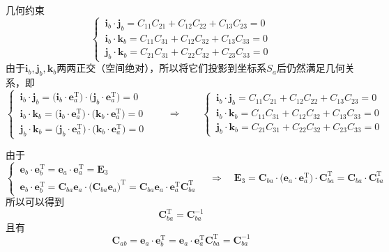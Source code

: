 \noa[2] 几何约束
\begin{equation}
	\begin{cases}
		\,\bm{i}_b \cdot \bm{j}_b = C_{11}C_{21} + C_{12}C_{22} + C_{13}C_{23} = 0 \\
		\,\bm{i}_b \cdot \bm{k}_b = C_{11}C_{31} + C_{12}C_{32} + C_{13}C_{33} = 0 \\
		\,\bm{j}_b \cdot \bm{k}_b = C_{21}C_{31} + C_{22}C_{32} + C_{23}C_{33} = 0
	\end{cases}
\end{equation}
\proof 由于$\bm{i}_b, \bm{j}_b, \bm{k}_b$两两正交（空间绝对），所以将它们投影到坐标系$S_a$后仍然满足几何关系，即
\begin{equation*}
	\begin{cases}
		\,\bm{i}_b \cdot \bm{j}_b = \big(\bm{i}_b \cdot \bm{e}_a^{\text{T}}\big) \cdot  \big(\bm{j}_b \cdot \bm{e}_a^{\text{T}}\big) = 0\\
		\,\bm{i}_b \cdot \bm{k}_b = \big(\bm{i}_b \cdot \bm{e}_a^{\text{T}}\big) \cdot \big(\bm{k}_b \cdot \bm{e}_a^{\text{T}}\big) = 0\\
		\,\bm{j}_b \cdot \bm{k}_b =\big(\bm{j}_b \cdot \bm{e}_a^{\text{T}}\big) \cdot \big(\bm{k}_b \cdot \bm{e}_a^{\text{T}}\big) = 0
	\end{cases}
	\qquad \Longrightarrow \qquad 
	\begin{cases}
		\,\bm{i}_b \cdot \bm{j}_b = C_{11}C_{21} + C_{12}C_{22} + C_{13}C_{23} = 0 \\
		\,\bm{i}_b \cdot \bm{k}_b = C_{11}C_{31} + C_{12}C_{32} + C_{13}C_{33} = 0 \\
		\,\bm{j}_b \cdot \bm{k}_b = C_{21}C_{31} + C_{22}C_{32} + C_{23}C_{33} = 0
	\end{cases}
\end{equation*}


\vspace*{0.5em}
\sssection[坐标变换矩阵是正交矩阵]

由于
\begin{equation*}
	\begin{cases}
		\,\bm{e}_b \cdot \bm{e}_b^{\text{T}} = \bm{e}_a \cdot \bm{e}_a^{\text{T}} = \bm{E}_3\\
		\,\bm{e}_b \cdot \bm{e}_b^{\text{T}} = \bm{C}_{ba}\bm{e}_a \cdot \big( \bm{C}_{ba} \bm{e}_a \big)^{\text{T}} =  \bm{C}_{ba}\bm{e}_a \cdot \bm{e}_a^{\text{T}} \bm{C}_{ba}^{\text{T}} 
	\end{cases}
	\quad \Rightarrow \quad \bm{E}_3 = \bm{C}_{ba} \cdot \big( \bm{e}_a \cdot \bm{e}_a^{\text{T}} \big) \cdot \bm{C}_{ba}^{\text{T}} =  \bm{C}_{ba} \cdot \bm{C}_{ba}^{\text{T}}
\end{equation*}
所以可以得到
\begin{equation}
	\bm{C}_{ba}^{\text{T}} = \bm{C}_{ba}^{-1}
\end{equation}
且有
\begin{equation}
	\bm{C}_{ab} = \bm{e}_a \cdot \bm{e}_b^{\text{T}} = \bm{e}_a \cdot \bm{e}_a^{\text{T}} \bm{C}_{ba}^{\text{T}} = \bm{C}_{ba}^{-1}
\end{equation}


